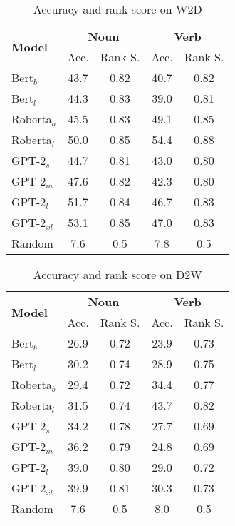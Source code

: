 \documentclass[11pt,a4paper]{article}
\begin{document}
\begin{table}
    \centering
    \begin{tabular}{l|cccc}
        \hline
         \multirow{2}{*}{\textbf{Model}} & \multicolumn{2}{c}{\textbf{Noun}} & \multicolumn{2}{c}{\textbf{Verb}} \\
         & Acc. & Rank S. & Acc. & Rank S. \\ \hline
     Bert$_{b}$ & 43.7 & 0.82 & 40.7 & 0.82 \\
     Bert$_{l}$ & 44.3 & 0.83 & 39.0 & 0.81 \\
     Roberta$_{b}$ & 45.5 & 0.83 & 49.1 & 0.85 \\
     Roberta$_{l}$ & 50.0 & 0.85 & 54.4 & 0.88 \\ \hline
     GPT-2$_{s}$ & 44.7 & 0.81 & 43.0 & 0.80 \\
     GPT-2$_{m}$ & 47.6 & 0.82 & 42.3 & 0.80 \\
     GPT-2$_{l}$ & 51.7 & 0.84 & 46.7 & 0.83 \\
     GPT-2$_{xl}$ & 53.1 & 0.85 & 47.0 & 0.83 \\ \hline 
     Random & 7.6 & 0.5 & 7.8 & 0.5 \\\hline
     
    \end{tabular}
    \caption{Accuracy and rank score on W2D}
    \label{tab:results_find_the_definition}
\end{table}


\begin{table}
    \centering
    \begin{tabular}{l|cccc}
        \hline
         \multirow{2}{*}{\textbf{Model}} & \multicolumn{2}{c}{\textbf{Noun}} & \multicolumn{2}{c}{\textbf{Verb}} \\
         & Acc. & Rank S. & Acc. & Rank S. \\ \hline
     Bert$_{b}$ & 26.9 & 0.72 & 23.9 & 0.73 \\
     Bert$_{l}$ & 30.2 & 0.74 & 28.9 & 0.75 \\
     Roberta$_{b}$ & 29.4 & 0.72 & 34.4 & 0.77 \\
     Roberta$_{l}$ & 31.5 & 0.74 & 43.7 & 0.82 \\ \hline
     GPT-2$_{s}$ & 34.2 & 0.78 & 27.7 & 0.69 \\
     GPT-2$_{m}$ & 36.2 & 0.79 & 24.8 & 0.69 \\
     GPT-2$_{l}$ & 39.0 & 0.80 & 29.0 & 0.72 \\
     GPT-2$_{xl}$ & 39.9 & 0.81 & 30.3 & 0.73 \\ \hline 
     Random & 7.6 & 0.5 & 8.0 & 0.5 \\\hline
     
    \end{tabular}
    \caption{Accuracy and rank score on D2W}
    \label{tab:results_find_the_word}
\end{table}
\end{document}
